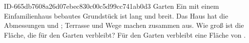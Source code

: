 \begin{exercise}
      {ID-665db7608a26d07ebec830c00c5d99cc741ab0d3}
      {Garten}
  \ifproblem\problem
    Ein mit einem Einfamilienhaus bebautes Grundstück ist  lang und
     breit. Das Haus hat die Abmessungen  und ;
    Terrasse und Wege machen zusammen  aus. Wie groß ist die
    Fläche, die für den Garten verbleibt?
  \fi
  \ifoutcome\outcome
    Für den Garten verbleibt eine Fläche von .
  \fi
\end{exercise}
